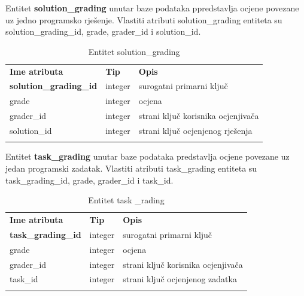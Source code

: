 \documentclass[times, utf8, zavrsni, numeric]{fer}
\begin{document}
		Entitet \textbf{solution\_grading} unutar baze podataka ppredstavlja ocjene povezane uz jedno programsko rješenje. Vlastiti atributi solution\_grading entiteta su solution\_grading\_id, grade, grader\_id i solution\_id. 
		\begin{table}[H]
			\caption{Entitet solution\_grading}
			\label{tbl:solutiongrading}
			\centering
			\begin{tabu} to \textwidth {XXX}
				\tabucline[1.75pt]{-}
				\textbf{Ime atributa} & \textbf{Tip} & \textbf{Opis}\\ 				
				\tabucline[1.75pt]{-}
				\textbf{solution\_grading\_id} & integer & surogatni primarni ključ\\ \hline
				grade & integer & ocjena\\ \hline
				grader\_id & integer & strani ključ korisnika ocjenjivača\\ \hline
				solution\_id & integer & strani ključ ocjenjenog rješenja\\ \hline
				\tabucline[1.75pt]{-}
			\end{tabu}
		\end{table}
	
		Entitet \textbf{task\_grading} unutar baze podataka predstavlja ocjene povezane uz jedan programski zadatak. Vlastiti atributi task\_grading entiteta su task\_grading\_id, grade, grader\_id i task\_id. 
		\begin{table}[H]
			\caption{Entitet task \_rading}
			\label{tbl:taskgrading}
			\centering
			\begin{tabu} to \textwidth {XXX}
				\tabucline[1.75pt]{-}
				\textbf{Ime atributa} & \textbf{Tip} & \textbf{Opis}\\ 				
				\tabucline[1.75pt]{-}
				\textbf{task\_grading\_id} & integer & surogatni primarni ključ\\ \hline
				grade & integer & ocjena\\ \hline
				grader\_id & integer & strani ključ korisnika ocjenjivača\\ \hline
				task\_id & integer & strani ključ ocjenjenog zadatka\\ \hline
				\tabucline[1.75pt]{-}
			\end{tabu}
		\end{table}
	
\end{document}
